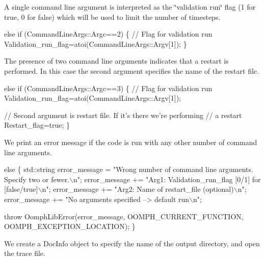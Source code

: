 A single command line argument is interpreted as the \char`\"{}validation run\char`\"{} flag (1 for true, 0 for false) which will be used to limit the number of timesteps.


\begin{DoxyCodeInclude}
 \textcolor{keywordflow}{else} \textcolor{keywordflow}{if} (CommandLineArgs::Argc==2)
  \{
   \textcolor{comment}{// Flag for validation run}
   Validation\_run\_flag=atoi(CommandLineArgs::Argv[1]);
  \}

\end{DoxyCodeInclude}


The presence of two command line arguments indicates that a restart is performed. In this case the second argument specifies the name of the restart file.


\begin{DoxyCodeInclude}
 \textcolor{keywordflow}{else} \textcolor{keywordflow}{if} (CommandLineArgs::Argc==3)
  \{
   \textcolor{comment}{// Flag for validation run}
   Validation\_run\_flag=atoi(CommandLineArgs::Argv[1]);

   \textcolor{comment}{// Second argument is restart file. If it's there we're performing}
   \textcolor{comment}{// a restart}
   Restart\_flag=\textcolor{keyword}{true};
  \}

\end{DoxyCodeInclude}


We print an error message if the code is run with any other number of command line arguments.


\begin{DoxyCodeInclude}
 \textcolor{keywordflow}{else}
  \{
   std::string error\_message =
    \textcolor{stringliteral}{"Wrong number of command line arguments. Specify two or fewer.\(\backslash\)n"};
   error\_message += \textcolor{stringliteral}{"Arg1: Validation\_run\_flag [0/1] for [false/true]\(\backslash\)n"};
   error\_message += \textcolor{stringliteral}{"Arg2: Name of restart\_file (optional)\(\backslash\)n"};
   error\_message += \textcolor{stringliteral}{"No arguments specified --> default run\(\backslash\)n"};
   
   \textcolor{keywordflow}{throw} OomphLibError(error\_message,
                       OOMPH\_CURRENT\_FUNCTION,
                       OOMPH\_EXCEPTION\_LOCATION);
  \}

\end{DoxyCodeInclude}


We create a {\ttfamily Doc\+Info} object to specify the name of the output directory, and open the trace file.


